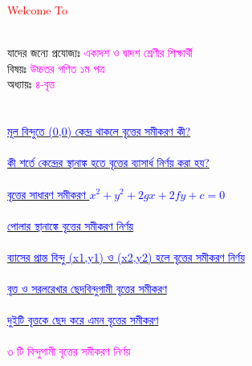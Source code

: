 \documentclass{article}
\begin{document}
 
	\Large
	\textcolor{red}{Welcome To} 
	\\
	\\
	যাদের জন্যে প্রযোজ্যঃ  	\textcolor{magenta}{একাদশ ও দ্বাদশ শ্রেণীর শিক্ষার্থী} \\
	বিষয়ঃ \textcolor{magenta}{উচ্চতর গণিত ১ম পত্র} \\
	অধ্যায়ঃ \textcolor{magenta}{৪-বৃত্ত}\\ 
	\\
	\\
	\href{https://www.youtube.com/watch?v=DRxNte3mU6U&list=PLIjPH8h-K22w5iYZogyV1AI8-baSpY2Qn&index=1}{\textcolor{blue}{মূল বিন্দুতে (0,0) কেন্দ্র থাকলে বৃত্তের সমীকরণ কী?}}\\
	\\
\href{https://www.youtube.com/watch?v=rGCA1MltZsY&list=PLIjPH8h-K22w5iYZogyV1AI8-baSpY2Qn&index=2}{\textcolor{blue}{কী শর্তে কেন্দ্রের স্থানাঙ্ক হতে বৃত্তের ব্যাসার্ধ নির্ণয় করা হয়?}}\\
	\\
	\href{https://www.youtube.com/watch?v=gehIW-_0XrQ&list=PLIjPH8h-K22w5iYZogyV1AI8-baSpY2Qn&index=3}{\textcolor{blue}{বৃত্তের সাধারণ সমীকরণ $x^2+y^2+2gx+2fy+c=0$}}\\
	\\
		\href{https://www.youtube.com/watch?v=WzuG-MuA6Cs&list=PLIjPH8h-K22w5iYZogyV1AI8-baSpY2Qn&index=4}{\textcolor{blue}{পোলার স্থানাঙ্কে বৃত্তের সমীকরণ নির্ণয়}}\\
		\\
			\href{https://www.youtube.com/watch?v=ssCuBx7HEHI&list=PLIjPH8h-K22w5iYZogyV1AI8-baSpY2Qn&index=5}{\textcolor{blue}{ব্যাসের প্রান্ত বিন্দু (x1,y1) ও (x2,y2) হলে বৃত্তের সমীকরণ নির্ণয়}}\\
			\\
				\href{https://www.youtube.com/watch?v=afVjGQrIpDs&list=PLIjPH8h-K22w5iYZogyV1AI8-baSpY2Qn&index=6}{\textcolor{blue}{বৃত্ত ও সরলরেখার ছেদবিন্দুগামী বৃত্তের সমীকরণ}}\\
			\\
				\href{https://www.youtube.com/watch?v=rXOyjYE6YfU&list=PLIjPH8h-K22w5iYZogyV1AI8-baSpY2Qn&index=7}{\textcolor{blue}{দুইটি বৃত্তকে ছেদ করে এমন বৃত্তের সমীকরণ}}\\
		\\
	\textcolor{magenta}{৩ টি বিন্দুগামী বৃত্তের সমীকরণ নির্ণয় }\\
\end{document}
